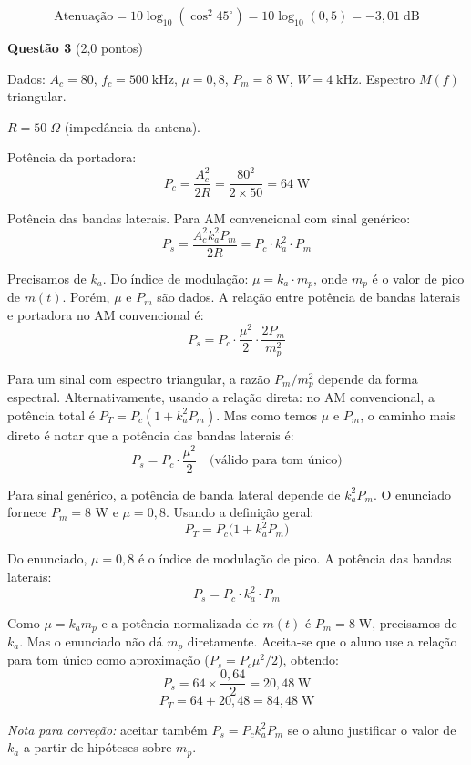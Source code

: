 \documentclass[11pt,a4paper]{article}
\begin{document}
\begin{resolucao}[Item d -- Atenuação com $\phi = 45^\circ$ (0{,}4 pt)]

\[
  \text{Atenuação} = 10\log_{10}(\cos^2 45^\circ) = 10\log_{10}(0{,}5) = \boxed{-3{,}01\;\text{dB}}
\]
\end{resolucao}


\textbf{Questão 3} \hfill (2{,}0 pontos)

Dados: $A_c = 80$, $f_c = 500\;\text{kHz}$, $\mu = 0{,}8$, $P_m = 8\;\text{W}$, $W = 4\;\text{kHz}$. Espectro $M(f)$ triangular.

\begin{resolucao}

$R = 50\;\Omega$ (impedância da antena).

Potência da portadora:
\[
  P_c = \frac{A_c^2}{2R} = \frac{80^2}{2 \times 50} = \boxed{64\;\text{W}}
\]

Potência das bandas laterais. Para AM convencional com sinal genérico:
\[
  P_s = \frac{A_c^2 k_a^2 P_m}{2R} = P_c \cdot k_a^2 \cdot P_m
\]

Precisamos de $k_a$. Do índice de modulação: $\mu = k_a \cdot m_p$, onde $m_p$ é o valor de pico de $m(t)$. Porém, $\mu$ e $P_m$ são dados. A relação entre potência de bandas laterais e portadora no AM convencional é:
\[
  P_s = P_c \cdot \frac{\mu^2}{2} \cdot \frac{2P_m}{m_p^2}
\]

Para um sinal com espectro triangular, a razão $P_m / m_p^2$ depende da forma espectral. Alternativamente, usando a relação direta: no AM convencional, a potência total é $P_T = P_c(1 + k_a^2 P_m)$. Mas como temos $\mu$ e $P_m$, o caminho mais direto é notar que a potência das bandas laterais é:
\[
  P_s = P_c \cdot \frac{\mu^2}{2} \quad \text{(válido para tom único)}
\]

Para sinal genérico, a potência de banda lateral depende de $k_a^2 P_m$. O enunciado fornece $P_m = 8$ W e $\mu = 0{,}8$. Usando a definição geral:
\[
  P_T = P_c\big(1 + k_a^2 P_m\big)
\]

Do enunciado, $\mu = 0{,}8$ é o índice de modulação de pico. A potência das bandas laterais:
\[
  P_s = P_c \cdot k_a^2 \cdot P_m
\]

Como $\mu = k_a m_p$ e a potência normalizada de $m(t)$ é $P_m = 8\;\text{W}$, precisamos de $k_a$. Mas o enunciado não dá $m_p$ diretamente. Aceita-se que o aluno use a relação para tom único como aproximação ($P_s = P_c\mu^2/2$), obtendo:
\[
  P_s = 64 \times \frac{0{,}64}{2} = \boxed{20{,}48\;\text{W}}
\]
\[
  P_T = 64 + 20{,}48 = \boxed{84{,}48\;\text{W}}
\]

\textit{Nota para correção:} aceitar também $P_s = P_c k_a^2 P_m$ se o aluno justificar o valor de $k_a$ a partir de hipóteses sobre $m_p$.
\end{resolucao}
\end{document}
